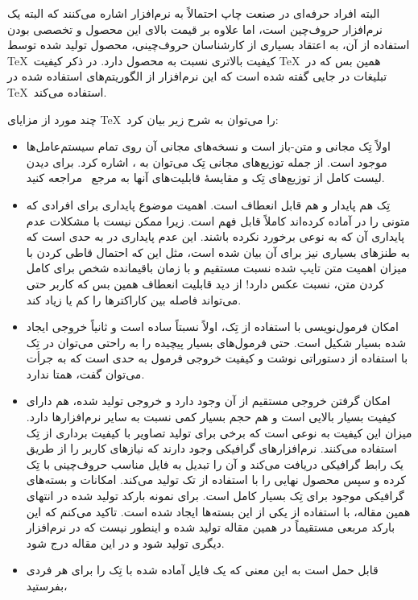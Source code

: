 البته افراد حرفه‌ای در صنعت چاپ احتمالاً به نرم‌افزار  اشاره می‌کنند
که البته یک نرم‌افزار حروف‌چین است، اما علاوه بر قیمت بالای این محصول و تخصصی
بودن استفاده از آن، به اعتقاد بسیاری از کارشناسان حروف‌چینی، محصول تولید شده
توسط \TeX\  کیفیت بالاتری نسبت به محصول  دارد. در ذکر کیفیت
\TeX\   همین بس که در تبلیغات    در جایی گفته شده است که این نرم‌افزار
از الگوریتم‌های استفاده شده در \TeX\   استفاده می‌کند. 

چند مورد از مزایای \TeX \ را می‌توان به شرح زیر بیان کرد:
\begin{itemize}
\item اولاً تِک مجانی و متن-باز است و نسخه‌های مجانی آن روی تمام سیستم‌عامل‌ها موجود است. از
جمله توزیع‌های مجانی تِک می‌توان به ،  اشاره کرد.
برای دیدن لیست کامل از توزیع‌های تِک  و مقایسۀ قابلیت‌های آنها به مرجع~\cite{Latex} مراجعه کنید.
\item تِک هم پایدار و هم قابل انعطاف است. اهمیت موضوع پایداری برای افرادی که متونی
را در  آماده کرده‌اند کاملاً قابل فهم است. زیرا ممکن نیست با مشکلات عدم پایداری
آن که به نوعی برخورد نکرده باشند. این عدم پایداری در  به حدی است که
به طنزهای بسیاری نیز برای آن بیان شده است، مثل این که احتمال قاطی کردن 
با میزان اهمیت متن تایپ شده نسبت مستقیم و با زمان باقیمانده شخص 
برای کامل کردن متن، نسبت عکس دارد! از دید قابلیت انعطاف همین بس که کاربر حتی
می‌تواند فاصله بین کاراکترها را کم یا زیاد کند. 
\item امکان فرمول‌نویسی با استفاده از تِک، اولاً نسبتاً ساده است و ثانیاً خروجی
ایجاد شده بسیار شکیل است. حتی فرمول‌های بسیار پیچیده را به راحتی می‌توان
در تِک با استفاده از دستوراتی نوشت و کیفیت خروجی فرمول به حدی است که به جرأت
می‌توان گفت، همتا ندارد.
\item امکان گرفتن خروجی  مستقیم از آن وجود دارد و خروجی 
تولید شده، هم دارای کیفیت بسیار بالایی است و هم حجم بسیار کمی نسبت به سایر نرم‌افزارها
دارد. میزان این کیفیت به نوعی است که برخی برای تولید تصاویر با کیفیت برداری
از تِک استفاده می‌کنند. نرم‌افزارهای گرافیکی وجود دارند که نیازهای کاربر را از طریق یک رابط
گرافیکی دریافت می‌کند و آن را تبدیل به فایل مناسب حروف‌چینی با تِک کرده و سپس محصول نهایی
را با استفاده از تک تولید می‌کند. امکانات و بسته‌های گرافیکی موجود برای تِک بسیار کامل 
است. برای نمونه بارکد تولید شده در انتهای همین مقاله، با استفاده از یکی از این بسته‌ها 
ایجاد شده است. تاکید می‌کنم که این بارکد مربعی مستقیماً در همین مقاله تولید شده و اینطور نیست 
که در نرم‌افزار دیگری تولید شود و در این مقاله درج شود.
\item قابل حمل است به این معنی که یک فایل آماده شده با تِک را برای هر فردی بفرستید،

\end{itemize}
